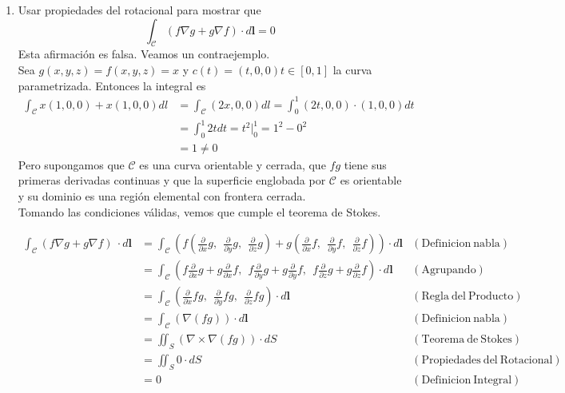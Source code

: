 \documentclass{article}
\begin{document}
\begin{enumerate}
        \item {
            Usar propiedades del rotacional para mostrar que
            \[
                \int_{\mathcal{C}} {{\left(f \nabla g + g \nabla f\right)} \cdot d\mathbf{l}} = 0
            \]
            \color{azul}
            Esta afirmación es falsa. Veamos un contraejemplo.\\
            Sea $g(x, y, z) = f(x, y, z) = x$ y $c(t) = (t, 0, 0) t\in [0, 1]$ la
            curva parametrizada.
            Entonces la integral es
            \begin{align*}
                \int_{\mathcal{C}}{x(1, 0, 0) + x(1, 0, 0)dl} &= \int_{\mathcal{C}}{(2x, 0, 0)dl}
                = \int_{0}^{1}{(2t, 0, 0)\cdot (1, 0, 0)dt} \\
                &= \int_{0}^{1}{2tdt}  = t^{2} \Big |_{0}^{1} = 1^{2} - 0^{2} \\
                &= 1 \neq 0
            \end{align*}
            Pero supongamos que $\mathcal{C}$ es una curva orientable y cerrada,
            que $fg$ tiene sus primeras derivadas continuas y que la
            superficie englobada por $\mathcal{C}$ es orientable y su dominio es
            una región elemental con frontera cerrada.\\
            Tomando las condiciones válidas, vemos que cumple el teorema de Stokes.

            \begin{align*}
                \int_{\mathcal{C}} {{\left(f \nabla g + g \nabla f\right)}\ \cdot d\mathbf{l}}
				&= \int_{\mathcal{C}} \left(f \left(\frac{\partial}{\partial x} g,\ \ \frac{\partial}{\partial y}g,\ \ \frac{\partial}{\partial z}g\right) + g \left(\frac{\partial}{\partial x} f,\ \ \frac{\partial}{\partial y}f,\ \ \frac{\partial}{\partial z}f\right)\right) \cdot d\mathbf{l} &\mathrm{(Definicion \ nabla)}\\
				&=\int_{\mathcal{C}}\left(f\frac{\partial}{\partial x} g + g\frac{\partial}{\partial x} f ,\ \ f \frac{\partial}{\partial y} g + g\frac{\partial}{\partial y} f ,\ \ f \frac{\partial}{\partial z} g + g \frac{\partial}{\partial z} f \right) \cdot d\mathbf{l} & \mathrm{(Agrupando)}\\
                &= \int_{\mathcal{C}}\left(\frac{\partial}{\partial x} fg,\ \ \frac{\partial}{\partial y}fg,\ \ \frac{\partial}{\partial z}fg\right) \cdot d\mathbf{l} &\mathrm{(Regla \ del \  Producto)}\\
&=\int_{\mathcal{C}}(\nabla(fg)) \cdot d\mathbf{l} &\mathrm{(Definicion \ nabla)}\\
&=\iint_{S} (\nabla \times \nabla(fg)) \cdot dS &\mathrm{(Teorema \ de \ Stokes)}\\
&=\iint_{S} 0 \cdot dS &\mathrm{(Propiedades \ del \ Rotacional)}\\
&= 0 &\mathrm{(Definicion \ Integral)}
            \end{align*}



        }
    \end{enumerate}
\end{document}
